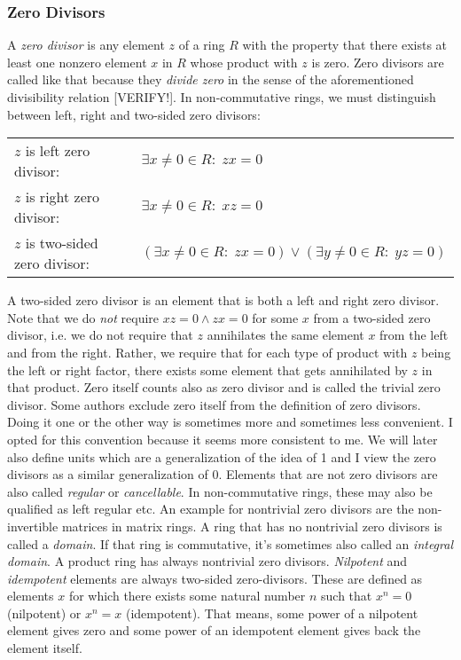 \subsubsection{Zero Divisors}
A \emph{zero divisor} is any element $z$ of a ring $R$ with the property that there exists at least one nonzero element $x$ in $R$ whose product with $z$ is zero. Zero divisors are called like that because they \emph{divide zero} in the sense of the aforementioned divisibility relation [VERIFY!]. In non-commutative rings, we must distinguish between left, right and two-sided zero divisors:

\medskip
\begin{tabular}{l l}
$z$ is left zero divisor:       & $\exists x \neq 0 \in R: \; z x = 0$  \\
$z$ is right zero divisor:      & $\exists x \neq 0 \in R: \; x z = 0$  \\
$z$ is two-sided zero divisor:  & $(\exists x \neq 0 \in R: \; z x = 0) 
                              \vee (\exists y \neq 0 \in R: \; y z = 0)$  \\
\end{tabular}
\medskip

A two-sided zero divisor is an element that is both a left and right zero divisor. Note that we do \emph{not} require $x z = 0 \wedge z x = 0$ for some $x$ from a two-sided zero divisor, i.e. we do not require that $z$ annihilates the same element $x$ from the left and from the right. Rather, we require that for each type of product with $z$ being the left or right factor, there exists some element that gets annihilated by $z$ in that product. Zero itself counts also as zero divisor and is called the trivial zero divisor. Some authors exclude zero itself from the definition of zero divisors. Doing it one or the other way is sometimes more and sometimes less convenient. I opted for this convention because it seems more consistent to me. We will later also define units which are a generalization of the idea of 1 and I view the zero divisors as a similar generalization of 0. Elements that are not zero divisors are also called \emph{regular} or \emph{cancellable}. In non-commutative rings, these may also be qualified as left regular etc. An example for nontrivial zero divisors are the non-invertible matrices in matrix rings. A ring that has no nontrivial zero divisors is called a \emph{domain}. If that ring is commutative, it's sometimes also called an \emph{integral domain}. A product ring has always nontrivial zero divisors. \emph{Nilpotent} and \emph{idempotent} elements are always two-sided zero-divisors. These are defined as elements $x$ for which there exists some natural number $n$ such that $x^n = 0$ (nilpotent) or $x^n = x$ (idempotent). That means, some power of a nilpotent element gives zero and some power of an idempotent element gives back the element itself.

